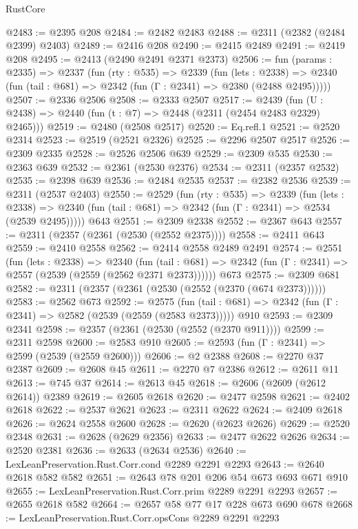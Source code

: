 \begin{lexlean}{RustCore}
\begin{coremodule}
@2483 := @2395 @208
@2484 := @2482 @2483
@2488 := @2311 (@2382 (@2484 @2399) @2403)
@2489 := @2416 @208
@2490 := @2415 @2489
@2491 := @2419 @208
@2495 := @2413 (@2490 @2491 @2371 @2373)
@2506 := fun (params : @2335) =>
  @2337
    (fun (rty : @535) =>
    @2339
      (fun (lets : @2338) =>
      @2340 (fun (tail : @681) => @2342 (fun (Γ : @2341) => @2380 (@2488 @2495)))))
@2507 := @2336 @2506
@2508 := @2333 @2507
@2517 := @2439 (fun (U : @2438) => @2440 (fun (t : @7) => @2448 (@2311 (@2454 @2483 @2329) @2465)))
@2519 := @2480 (@2508 @2517)
@2520 := Eq.refl.{1}
@2521 := @2520 @2314
@2523 := @2519 (@2521 @2326)
@2525 := @2296 @2507 @2517
@2526 := @2309 @2335
@2528 := @2526 @2506 @639
@2529 := @2309 @535
@2530 := @2363 @639
@2532 := @2361 (@2530 @2376)
@2534 := @2311 (@2357 @2532)
@2535 := @2398 @639
@2536 := @2484 @2535
@2537 := @2382 @2536
@2539 := @2311 (@2537 @2403)
@2550 := @2529
    (fun (rty : @535) =>
    @2339
      (fun (lets : @2338) =>
      @2340 (fun (tail : @681) => @2342 (fun (Γ : @2341) => @2534 (@2539 @2495)))))
    @643
@2551 := @2309 @2338
@2552 := @2367 @643
@2557 := @2311 (@2357 (@2361 (@2530 (@2552 @2375))))
@2558 := @2411 @643
@2559 := @2410 @2558
@2562 := @2414 @2558 @2489 @2491
@2574 := @2551
    (fun (lets : @2338) =>
    @2340
      (fun (tail : @681) => @2342 (fun (Γ : @2341) => @2557 (@2539 (@2559 (@2562 @2371 @2373))))))
    @673
@2575 := @2309 @681
@2582 := @2311 (@2357 (@2361 (@2530 (@2552 (@2370 (@674 @2373))))))
@2583 := @2562 @673
@2592 := @2575
    (fun (tail : @681) => @2342 (fun (Γ : @2341) => @2582 (@2539 (@2559 (@2583 @2373)))))
    @910
@2593 := @2309 @2341
@2598 := @2357 (@2361 (@2530 (@2552 (@2370 @911))))
@2599 := @2311 @2598
@2600 := @2583 @910
@2605 := @2593 (fun (Γ : @2341) => @2599 (@2539 (@2559 @2600)))
@2606 := @2 @2388
@2608 := @2270 @37 @2387
@2609 := @2608 @45
@2611 := @2270 @7 @2386
@2612 := @2611 @11
@2613 := @745 @37
@2614 := @2613 @45
@2618 := @2606 (@2609 (@2612 @2614)) @2389
@2619 := @2605 @2618
@2620 := @2477 @2598
@2621 := @2402 @2618
@2622 := @2537 @2621
@2623 := @2311 @2622
@2624 := @2409 @2618
@2626 := @2624 @2558 @2600
@2628 := @2620 (@2623 @2626)
@2629 := @2520 @2348
@2631 := @2628 (@2629 @2356)
@2633 := @2477 @2622 @2626
@2634 := @2520 @2381
@2636 := @2633 (@2634 @2536)
@2640 := LexLeanPreservation.Rust.Corr.cond @2289 @2291 @2293
@2643 := @2640 @2618 @582 @582
@2651 := @2643 @78 @201 @206 @54 @673 @693 @671 @910
@2655 := LexLeanPreservation.Rust.Corr.prim @2289 @2291 @2293
@2657 := @2655 @2618 @582
@2664 := @2657 @58 @77 @17 @228 @673 @690 @678
@2668 := LexLeanPreservation.Rust.Corr.opsCons @2289 @2291 @2293

\end{coremodule}
\end{lexlean}
